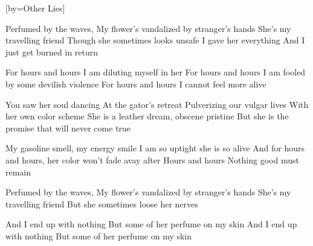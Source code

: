 [by={Other Lies}]


  \chordsoff
  \beginverse
  Perfumed by the waves,
  My flower's vandalized by stranger's hands
  She's my travelling friend
  Though she sometimes looks unsafe
  I gave her everything
  And I just get burned in return
  \endverse
  
  \beginchorus
  For hours and hours I am diluting myself in her
  For hours and hours I am fooled by some devilish violence
  For hours and hours I cannot feel more alive
  \endchorus
  
  \beginverse
  You saw her soul dancing
  At the gator's retreat
  Pulverizing our vulgar lives
  With her own color scheme
  She is a leather dream, obscene pristine
  But she is the promise that will never come true
  \endverse
  
  \beginchorus
  My gasoline smell, my energy smile
  I am so uptight she is so alive
  And for hours and hours, her color won't fade avay after
  Hours and hours
  Nothing good must remain
  \endchorus


  \beginverse
  Perfumed by the waves,
  My flower's vandalized by stranger's hands
  She's my travelling friend
  But she sometimes loose her nerves
  \endverse
  
  \beginchorus
  And I end up with nothing
  But some of her perfume on my skin
  And I end up with nothing
  But some of her perfume on my skin
  \endchorus
  
\endsong
